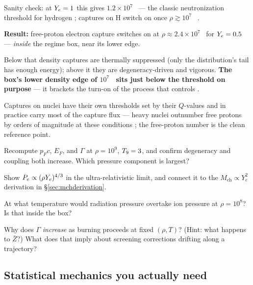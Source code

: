 Sanity check: at $Y_{e} = 1$ this gives $1.2\times10^{7}$~\gcc{} --- the classic
neutronization threshold for hydrogen \citep{shapiro1983}; captures on H switch
on once $\rho \gtrsim 10^{7}$~\gcc{} \citep{bildsten1998}. \yes{}

\begin{result}
\textbf{Result:} free-proton electron capture switches on at
$\rho \approx 2.4\times10^{7}$~\gcc{} for $Y_{e} = 0.5$ --- \emph{inside} the
regime box, near its lower edge.
\end{result}

Below that density captures are thermally suppressed (only the distribution's
tail has enough energy); above it they are degeneracy-driven and vigorous.
\textbf{The box's lower density edge of $10^{7}$~\gcc{} sits just below the
threshold on purpose} --- it brackets the turn-on of the process that controls
\Ye{}.

Captures on nuclei have their own thresholds set by their $Q$-values and in
practice carry most of the capture flux --- heavy nuclei outnumber free protons
by orders of magnitude at these conditions \citep{langanke2003}; the
free-proton number is the clean reference point.

\begin{selfcheck}
\item Recompute $p_F c$, $E_F$, and $\Gamma$ at $\rho = 10^{9}$, $T_{9} = 3$, and
      confirm degeneracy and coupling both increase. Which pressure component
      is largest?
\item Show $P_e \propto (\rho Y_{e})^{4/3}$ in the ultra-relativistic limit, and
      connect it to the $M_{\mathrm{ch}} \propto Y_e^2$ derivation in
      \S\ref{sec:mchderivation}.
\item At what temperature would radiation pressure overtake ion pressure at
      $\rho = 10^{8}$? Is that inside the box?
\item Why does $\Gamma$ \emph{increase} as burning proceeds at fixed
      $(\rho, T)$? (Hint: what happens to $\bar{Z}$?) What does that imply
      about screening corrections drifting along a trajectory?
\end{selfcheck}

\subsection{Statistical mechanics you actually need}
\label{sec:statmech}

